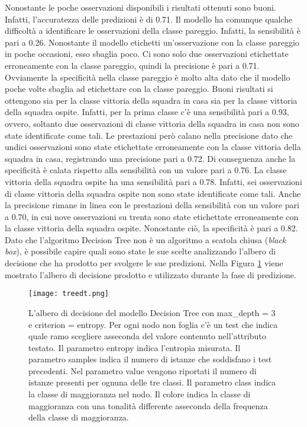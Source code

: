 Nonostante le poche osservazioni disponibili i risultati ottenuti sono buoni. Infatti, l'accuratezza delle predizioni è di 0.71. Il modello ha comunque qualche difficoltà a identificare le osservazioni della classe pareggio. Infatti, la sensibilità è pari a 0.26. Nonostante il modello etichetti un'osservazione con la classe pareggio in poche occasioni, esso sbaglia poco. Ci sono solo due osservazioni etichettate erroneamente con la classe pareggio, quindi la precisione è pari a 0.71. Ovviamente la specificità nella classe pareggio è molto alta dato che il modello poche volte sbaglia ad etichettare con la classe pareggio. Buoni risultati si ottengono sia per la classe vittoria della squadra in casa sia per la classe vittoria della squadra ospite. Infatti, per la prima classe c'è una sensibilità pari a 0.93, ovvero, soltanto due osservazioni di classe vittoria della squadra in casa non sono state identificate come tali. Le prestazioni però calano nella precisione dato che undici osservazioni sono state etichettate erroneamente con la classe vittoria della squadra in casa, registrando una precisione pari a 0.72. Di conseguenza anche la specificità è calata rispetto alla sensibilità con un valore pari a 0.76. La classe vittoria della squadra ospite ha una sensibilità pari a 0.78. Infatti, sei osservazioni di classe vittoria della squadra ospite non sono state identificate come tali. Anche la precisione rimane in linea con le prestazioni della sensibilità con un valore pari a 0.70, in cui nove osservazioni su trenta sono state etichettate erroneamente con la classe vittoria della squadra ospite. Nonostante ciò, la specificità è pari a 0.82.\\
Dato che l'algoritmo Decision Tree non è un algoritmo a scatola chiusa (\emph{black box}), è possibile capire quali sono state le sue scelte analizzando l'albero di decisione che ha prodotto per svolgere le sue predizioni. Nella Figura \ref{fig:dttree} viene mostrato l'albero di decisione prodotto e utilizzato durante la fase di predizione.
\begin{figure}[h]
	\begin{center}
		\texttt{[image: treedt.png]}
		\caption{L'albero di decisione del modello Decision Tree con \textsf{max\_dept}h = 3 e \textsf{criterion} = entropy. Per ogni nodo non foglia c'è un test che indica quale ramo scegliere asseconda del valore contenuto nell'attributo testato. Il parametro \textsf{entropy} indica l'entropia misurata. Il parametro \textsf{samples} indica il numero di istanze che soddisfano i test precedenti. Nel parametro \textsf{value} vengono riportati il numero di istanze presenti per ognuna delle tre classi. Il parametro \textsf{class} indica la classe di maggioranza nel nodo. Il colore indica la classe di maggioranza con una tonalità differente asseconda della frequenza della classe di maggioranza.
		} 
		\label{fig:dttree}
	\end{center}
\end{figure}
